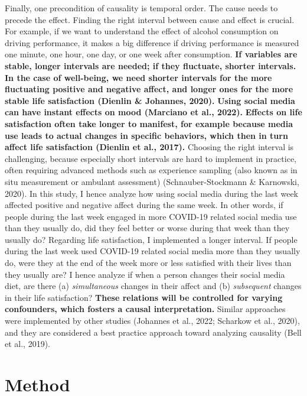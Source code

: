 \documentclass[
  man,mask]{apa7}
\begin{document}
Finally, one precondition of causality is temporal order.
The cause needs to precede the effect.
Finding the right interval between cause and effect is crucial.
For example, if we want to understand the effect of alcohol consumption on driving performance, it makes a big difference if driving performance is measured one minute, one hour, one day, or one week after consumption.
\textbf{If variables are stable, longer intervals are needed; if they fluctuate, shorter intervals.}
\textbf{In the case of well-being, we need shorter intervals for the more fluctuating positive and negative affect, and longer ones for the more stable life satisfaction (Dienlin \& Johannes, 2020).}
\textbf{Using social media can have instant effects on mood (Marciano et al., 2022).}
\textbf{Effects on life satisfaction often take longer to manifest, for example because media use leads to actual changes in specific behaviors, which then in turn affect life satisfaction (Dienlin et al., 2017).}
Choosing the right interval is challenging, because especially short intervals are hard to implement in practice, often requiring advanced methods such as experience sampling (also known as in situ measurement or ambulant assessment) (Schnauber-Stockmann \& Karnowski, 2020).
In this study, I hence analyze how using social media during the last week affected positive and negative affect during the same week.
In other words, if people during the last week engaged in more COVID-19 related social media use than they usually do, did they feel better or worse during that week than they usually do?
Regarding life satisfaction, I implemented a longer interval.
If people during the last week used COVID-19 related social media more than they usually do, were they at the end of the week more or less satisfied with their lives than they usually are?
I hence analyze if when a person changes their social media diet, are there (a) \emph{simultaneous} changes in their affect and (b) \emph{subsequent} changes in their life satisfaction?
\textbf{These relations will be controlled for varying confounders, which fosters a causal interpretation.}
Similar approaches were implemented by other studies (Johannes et al., 2022; Scharkow et al., 2020), and they are considered a best practice approach toward analyzing causality (Bell et al., 2019).

\hypertarget{method}{%
\section{Method}\label{method}}
\end{document}
